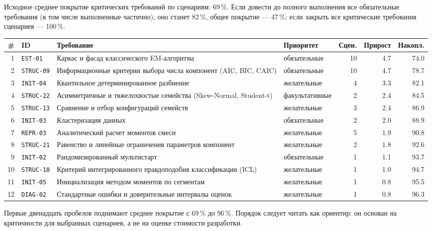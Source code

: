 \documentclass[10pt,a4paper]{article}
\begin{document}
Исходное среднее покрытие критических требований по сценариям: 69\,\%. Если довести до полного выполнения все обязательные требования (в том числе выполненные частично), оно станет 82\,\%,
общее покрытие --- 47\,\%; если закрыть все критические требования сценариев --- 100\,\%.
{\footnotesize
\begin{longtable}{@{}r l >{\raggedright\arraybackslash}p{5.8cm} l r r r@{}}
\toprule
\# & ID & Требование & Приоритет & Сцен. & Прирост & Накопл. \\
\midrule
\endhead
1 & \texttt{EST-01} & Каркас и фасад классического EM-алгоритма & обязательные & 10 & 4.7 & 74.0 \\
2 & \texttt{STRUC-09} & Информационные критерии выбора числа компонент (AIC, BIC, CAIC) & обязательные & 10 & 4.7 & 78.7 \\
3 & \texttt{INIT-04} & Квантильное детерминированное разбиение & желательные & 4 & 3.3 & 82.1 \\
4 & \texttt{STRUC-22} & Асимметричные и тяжелохвостые семейства (Skew-Normal, Student-t) & факультативные & 2 & 2.4 & 84.5 \\
5 & \texttt{STRUC-13} & Сравнение и отбор конфигураций семейств & желательные & 3 & 2.4 & 86.9 \\
6 & \texttt{INIT-03} & Кластеризация данных & обязательные & 2 & 2.0 & 88.9 \\
7 & \texttt{REPR-03} & Аналитический расчет моментов смеси & желательные & 5 & 1.9 & 90.8 \\
8 & \texttt{STRUC-21} & Равенство и линейные ограничения параметров компонент & желательные & 2 & 1.8 & 92.6 \\
9 & \texttt{INIT-02} & Рандомизированный мультистарт & обязательные & 1 & 1.1 & 93.7 \\
10 & \texttt{STRUC-10} & Критерий интегрированного правдоподобия классификации (ICL) & желательные & 1 & 1.0 & 94.7 \\
11 & \texttt{INIT-05} & Инициализация методом моментов по сегментам & желательные & 1 & 0.8 & 95.5 \\
12 & \texttt{DIAG-02} & Стандартные ошибки и доверительные интервалы оценок & желательные & 1 & 0.8 & 96.3 \\
\bottomrule
\end{longtable}}
Первые двенадцать пробелов поднимают среднее покрытие с 69\,\% до 96\,\%.
Порядок следует читать как ориентир: он основан на критичности для выбранных сценариев, а не на оценке стоимости разработки.
\end{document}
